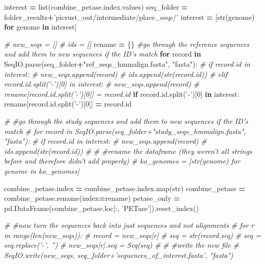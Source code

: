 \documentclass[
]{article}
\newenvironment{Shaded}{\begin{snugshade}}{\end{snugshade}}
\newcommand{\BuiltInTok}[1]{#1}
\newcommand{\CommentTok}[1]{\textcolor[rgb]{0.56,0.35,0.01}{\textit{#1}}}
\newcommand{\ControlFlowTok}[1]{\textcolor[rgb]{0.13,0.29,0.53}{\textbf{#1}}}
\newcommand{\DecValTok}[1]{\textcolor[rgb]{0.00,0.00,0.81}{#1}}
\newcommand{\KeywordTok}[1]{\textcolor[rgb]{0.13,0.29,0.53}{\textbf{#1}}}
\newcommand{\NormalTok}[1]{#1}
\newcommand{\OperatorTok}[1]{\textcolor[rgb]{0.81,0.36,0.00}{\textbf{#1}}}
\newcommand{\StringTok}[1]{\textcolor[rgb]{0.31,0.60,0.02}{#1}}
\begin{document}
\begin{Shaded}
\begin{Highlighting}[]
\NormalTok{interest }\OperatorTok{=} \BuiltInTok{list}\NormalTok{(combine_petase.index.values)}
\NormalTok{seq_folder }\OperatorTok{=}\NormalTok{ folder_results}\OperatorTok{+}\StringTok{'picrust_out/intermediate/place_seqs/'}
\NormalTok{interest }\OperatorTok{=}\NormalTok{ [}\BuiltInTok{str}\NormalTok{(genome) }\ControlFlowTok{for}\NormalTok{ genome }\KeywordTok{in}\NormalTok{ interest]}

\CommentTok{# new_seqs = []}
\CommentTok{# ids = []}
\NormalTok{rename }\OperatorTok{=}\NormalTok{ \{\}}
\CommentTok{#go through the reference sequences and add them to new sequences if the ID's match}
\ControlFlowTok{for}\NormalTok{ record }\KeywordTok{in}\NormalTok{ SeqIO.parse(seq_folder}\OperatorTok{+}\StringTok{"ref_seqs_hmmalign.fasta"}\NormalTok{, }\StringTok{"fasta"}\NormalTok{):}
    \CommentTok{# if record.id in interest:}
    \CommentTok{#   new_seqs.append(record)}
    \CommentTok{#   ids.append(str(record.id))}
    \CommentTok{# elif record.id.split('-')[0] in interest:}
    \CommentTok{#   new_seqs.append(record)}
    \CommentTok{#   rename[record.id.split('-')[0]] = record.id}
    \ControlFlowTok{if}\NormalTok{ record.}\BuiltInTok{id}\NormalTok{.split(}\StringTok{'-'}\NormalTok{)[}\DecValTok{0}\NormalTok{] }\KeywordTok{in}\NormalTok{ interest:}
\NormalTok{      rename[record.}\BuiltInTok{id}\NormalTok{.split(}\StringTok{'-'}\NormalTok{)[}\DecValTok{0}\NormalTok{]] }\OperatorTok{=}\NormalTok{ record.}\BuiltInTok{id}

\CommentTok{# #go through the study sequences and add them to new sequences if the ID's match}
\CommentTok{# for record in SeqIO.parse(seq_folder+"study_seqs_hmmalign.fasta", "fasta"):}
\CommentTok{#     if record.id in interest:}
\CommentTok{#       new_seqs.append(record)}
\CommentTok{#       ids.append(str(record.id))}
\CommentTok{#  }
\CommentTok{# #rename the dataframe (they weren't all strings before and therefore didn't add properly)     }
\CommentTok{# ko_genomes = [str(genome) for genome in ko_genomes]}

\NormalTok{combine_petase.index }\OperatorTok{=}\NormalTok{ combine_petase.index.}\BuiltInTok{map}\NormalTok{(}\BuiltInTok{str}\NormalTok{)}
\NormalTok{combine_petase }\OperatorTok{=}\NormalTok{ combine_petase.rename(index}\OperatorTok{=}\NormalTok{rename)}
\NormalTok{petase_only }\OperatorTok{=}\NormalTok{ pd.DataFrame(combine_petase.loc[:, }\StringTok{'PETase'}\NormalTok{]).reset_index()}

\CommentTok{# #now turn the sequences back into just sequences and not alignments}
\CommentTok{# for r in range(len(new_seqs)):}
\CommentTok{#   record = new_seqs[r]}
\CommentTok{#   seq = str(record.seq)}
\CommentTok{#   seq = seq.replace('-', '')}
\CommentTok{#   new_seqs[r].seq = Seq(seq)}
\CommentTok{# }
\CommentTok{# #write the new file}
\CommentTok{# SeqIO.write(new_seqs, seq_folder+'sequences_of_interest.fasta', "fasta")}
\end{Highlighting}
\end{Shaded}
\end{document}
